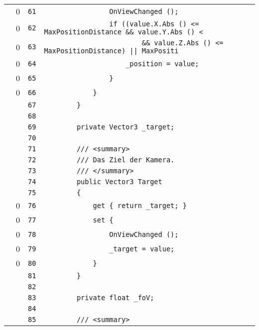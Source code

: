 \documentclass[a4paper,10pt]{article}
\begin{document}
\begin{longtable}[l]{lrrl}
\cellcolor{red} & 0 & \verb~61~ & \verb~                OnViewChanged ();~\\
\cellcolor{red} & 0 & \verb~62~ & \verb~                if ((value.X.Abs () <= MaxPositionDistance && value.Y.Abs () <~\\
\cellcolor{red} & 0 & \verb~63~ & \verb~                        && value.Z.Abs () <= MaxPositionDistance) || MaxPositi~\\
\cellcolor{red} & 0 & \verb~64~ & \verb~                    _position = value;~\\
\cellcolor{red} & 0 & \verb~65~ & \verb~                }~\\
\cellcolor{red} & 0 & \verb~66~ & \verb~            }~\\
\cellcolor{gray} &  & \verb~67~ & \verb~        }~\\
\cellcolor{gray} &  & \verb~68~ & \verb~~\\
\cellcolor{gray} &  & \verb~69~ & \verb~        private Vector3 _target;~\\
\cellcolor{gray} &  & \verb~70~ & \verb~~\\
\cellcolor{gray} &  & \verb~71~ & \verb~        /// <summary>~\\
\cellcolor{gray} &  & \verb~72~ & \verb~        /// Das Ziel der Kamera.~\\
\cellcolor{gray} &  & \verb~73~ & \verb~        /// </summary>~\\
\cellcolor{gray} &  & \verb~74~ & \verb~        public Vector3 Target~\\
\cellcolor{gray} &  & \verb~75~ & \verb~        {~\\
\cellcolor{red} & 0 & \verb~76~ & \verb~            get { return _target; }~\\
\cellcolor{red} & 0 & \verb~77~ & \verb~            set {~\\
\cellcolor{red} & 0 & \verb~78~ & \verb~                OnViewChanged ();~\\
\cellcolor{red} & 0 & \verb~79~ & \verb~                _target = value;~\\
\cellcolor{red} & 0 & \verb~80~ & \verb~            }~\\
\cellcolor{gray} &  & \verb~81~ & \verb~        }~\\
\cellcolor{gray} &  & \verb~82~ & \verb~~\\
\cellcolor{gray} &  & \verb~83~ & \verb~        private float _foV;~\\
\cellcolor{gray} &  & \verb~84~ & \verb~~\\
\cellcolor{gray} &  & \verb~85~ & \verb~        /// <summary>~\\

\end{longtable}
\end{document}
